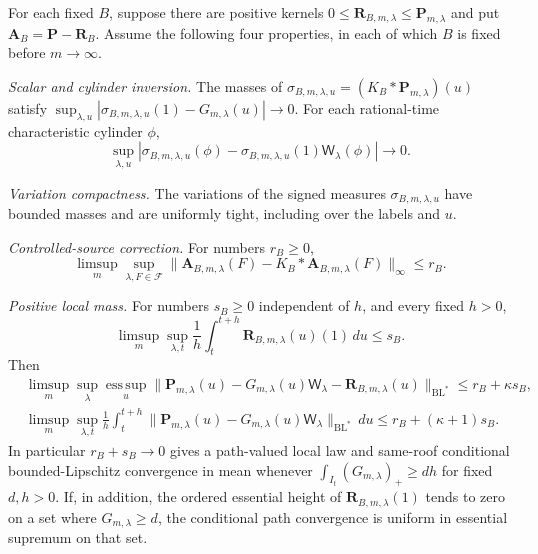 \begin{theorem}
\label{thm:v53-abstract-transfer}
For each fixed $B$, suppose there are positive kernels
$0\le\mathbf R_{B,m,\lambda}\le\mathbf P_{m,\lambda}$ and put
$\mathbf A_B=\mathbf P-\mathbf R_B$. Assume the following four
properties, in each of which $B$ is fixed before $m\to\infty$.

\emph{Scalar and cylinder inversion.} The masses of
$\sigma_{B,m,\lambda,u}=(K_B*\mathbf P_{m,\lambda})(u)$ satisfy
$\sup_{\lambda,u}|\sigma_{B,m,\lambda,u}(1)-G_{m,\lambda}(u)|\to0$.
For each rational-time characteristic cylinder $\phi$,
\[
 \sup_{\lambda,u}|\sigma_{B,m,\lambda,u}(\phi)
             -\sigma_{B,m,\lambda,u}(1)\mathsf W_\lambda(\phi)|\to0.
\]

\emph{Variation compactness.} The variations of the signed measures
$\sigma_{B,m,\lambda,u}$ have bounded masses and are uniformly tight,
including over the labels and $u$.

\emph{Controlled-source correction.} For numbers $r_B\ge0$,
\[
 \limsup_m\sup_{\lambda,F\in\mathcal F}
 \|\mathbf A_{B,m,\lambda}(F)
          -K_B*\mathbf A_{B,m,\lambda}(F)\|_\infty\le r_B.
\]

\emph{Positive local mass.} For numbers $s_B\ge0$ independent of
$h$, and every fixed $h>0$,
\[
 \limsup_m\sup_{\lambda,t}\frac1h
       \int_t^{t+h}\mathbf R_{B,m,\lambda}(u)(1)\,du\le s_B.
\]
Then
\begin{align}
 &\limsup_m\sup_\lambda\operatorname*{ess\,sup}_u
 \|\mathbf P_{m,\lambda}(u)-G_{m,\lambda}(u)\mathsf W_\lambda
                  -\mathbf R_{B,m,\lambda}(u)\|_{\mathrm{BL}^*}
                      \le r_B+\kappa s_B,\label{eq:v53-abstract-positive}\\
 &\limsup_m\sup_{\lambda,t}\frac1h\int_t^{t+h}
 \|\mathbf P_{m,\lambda}(u)-G_{m,\lambda}(u)\mathsf W_\lambda
                              \|_{\mathrm{BL}^*}\,du
                      \le r_B+(\kappa+1)s_B.\label{eq:v53-abstract-local}
\end{align}
In particular $r_B+s_B\to0$ gives a path-valued local law and
same-roof conditional bounded-Lipschitz convergence in mean whenever
$\int_{I_t}(G_{m,\lambda})_+\ge dh$ for fixed $d,h>0$.
If, in addition, the ordered essential height of
$\mathbf R_{B,m,\lambda}(1)$ tends to zero on a set where
$G_{m,\lambda}\ge d$, the conditional path convergence is uniform
in essential supremum on that set.
\end{theorem}
